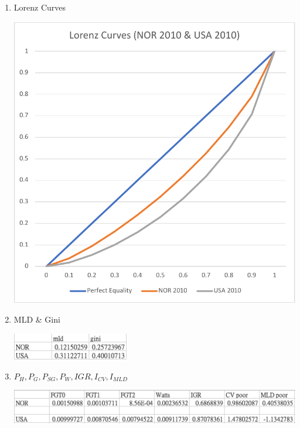 \documentclass{article}[13pt]
\begin{document}
\begin{enumerate}
    \item{Lorenz Curves}
    
    \includegraphics[width=5in]{nor_usa_lorenz.pdf}

    \item{MLD \& Gini}
    
    \includegraphics[width=2in]{nor_usa_2.png}

    \item{$P_H, P_G, P_{SG}, P_W, IGR, I_{CV}, I_{MLD}$}
    
    \includegraphics[width=5in]{nor_usa_1.png}
\end{enumerate}
\end{document}

